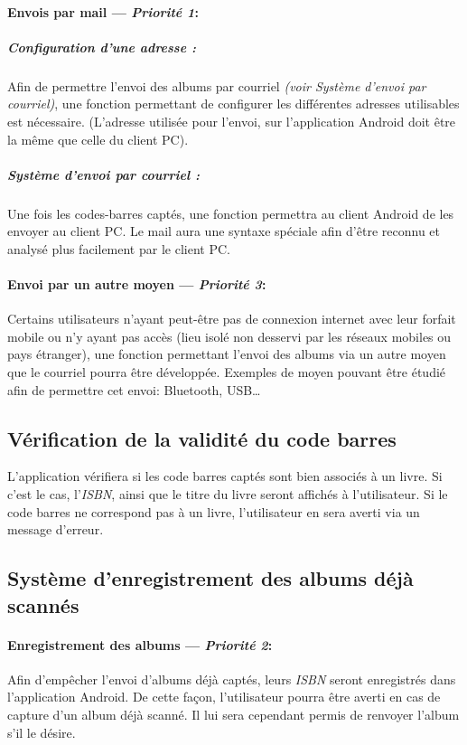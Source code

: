 \paragraph{Envois par mail ---  \textit{Priorité 1}:}
\subparagraph{Configuration d'une adresse :}
Afin de permettre l'envoi des albums par courriel \textit{(voir Système d'envoi par courriel)}, une fonction permettant de configurer les différentes adresses utilisables est nécessaire. (L'adresse utilisée pour l'envoi, sur l'application Android doit être la même que celle du client PC).

\subparagraph{Système d'envoi par courriel :} 
Une fois les codes-barres captés, une fonction permettra au client Android de les envoyer au client PC. 
Le mail aura une syntaxe spéciale afin d'être reconnu et analysé plus facilement par le client PC. 

\paragraph{Envoi par un autre moyen ---  \textit{Priorité 3}:}
Certains utilisateurs n'ayant peut-être pas de connexion internet avec leur forfait mobile ou n'y ayant pas accès (lieu isolé non desservi par les réseaux mobiles ou pays étranger), une fonction permettant l'envoi des albums via un autre moyen que le courriel pourra être développée.
Exemples de moyen pouvant être étudié afin de permettre cet envoi: Bluetooth, USB…

\subsection{Vérification de la validité du code barres}
L'application vérifiera si les code barres captés sont bien associés à un livre.
Si c'est le cas, l'\emph{ISBN}, ainsi que le titre du livre seront affichés à l'utilisateur.
Si le code barres ne correspond pas à un livre, l'utilisateur en sera averti via un message d'erreur.

\subsection{Système d'enregistrement des albums déjà scannés}
\paragraph{Enregistrement des albums ---  \textit{Priorité 2}:} 
Afin d'empêcher l'envoi d'albums déjà captés, leurs \emph{ISBN} seront enregistrés dans l'application Android. 
De cette façon, l'utilisateur pourra être averti en cas de capture d'un album déjà scanné.
Il lui sera cependant permis de renvoyer l'album s'il le désire.

